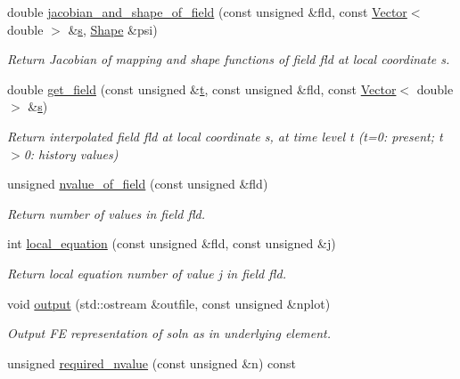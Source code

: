 \begin{DoxyCompactItemize}
double \hyperlink{classoomph_1_1ProjectableDarcyElement_a2dad4f7a1d4bdeeb2bc928677572db03}{jacobian\+\_\+and\+\_\+shape\+\_\+of\+\_\+field} (const unsigned \&fld, const \hyperlink{classoomph_1_1Vector}{Vector}$<$ double $>$ \&\hyperlink{cfortran_8h_ab7123126e4885ef647dd9c6e3807a21c}{s}, \hyperlink{classoomph_1_1Shape}{Shape} \&psi)
\begin{DoxyCompactList}\small\item\em Return Jacobian of mapping and shape functions of field fld at local coordinate s. \end{DoxyCompactList}\item 
double \hyperlink{classoomph_1_1ProjectableDarcyElement_a3911971a5babcc1bb85bd1dd46b30fc9}{get\+\_\+field} (const unsigned \&\hyperlink{cfortran_8h_af6f0bd3dc13317f895c91323c25c2b8f}{t}, const unsigned \&fld, const \hyperlink{classoomph_1_1Vector}{Vector}$<$ double $>$ \&\hyperlink{cfortran_8h_ab7123126e4885ef647dd9c6e3807a21c}{s})
\begin{DoxyCompactList}\small\item\em Return interpolated field fld at local coordinate s, at time level t (t=0\+: present; t$>$0\+: history values) \end{DoxyCompactList}\item 
unsigned \hyperlink{classoomph_1_1ProjectableDarcyElement_a5d7312cd8fb27bd36ac014b180bf5f1a}{nvalue\+\_\+of\+\_\+field} (const unsigned \&fld)
\begin{DoxyCompactList}\small\item\em Return number of values in field fld. \end{DoxyCompactList}\item 
int \hyperlink{classoomph_1_1ProjectableDarcyElement_a7c003fb90c5a5892ce176b67f3cf18a0}{local\+\_\+equation} (const unsigned \&fld, const unsigned \&j)
\begin{DoxyCompactList}\small\item\em Return local equation number of value j in field fld. \end{DoxyCompactList}\item 
void \hyperlink{classoomph_1_1ProjectableDarcyElement_a37aa5179ccb845ed3e9b311758c7ae09}{output} (std\+::ostream \&outfile, const unsigned \&nplot)
\begin{DoxyCompactList}\small\item\em Output FE representation of soln as in underlying element. \end{DoxyCompactList}\item 
unsigned \hyperlink{classoomph_1_1ProjectableDarcyElement_ae250fc064c8c4d34f4e58191c6742df5}{required\+\_\+nvalue} (const unsigned \&n) const

\end{DoxyCompactItemize}
